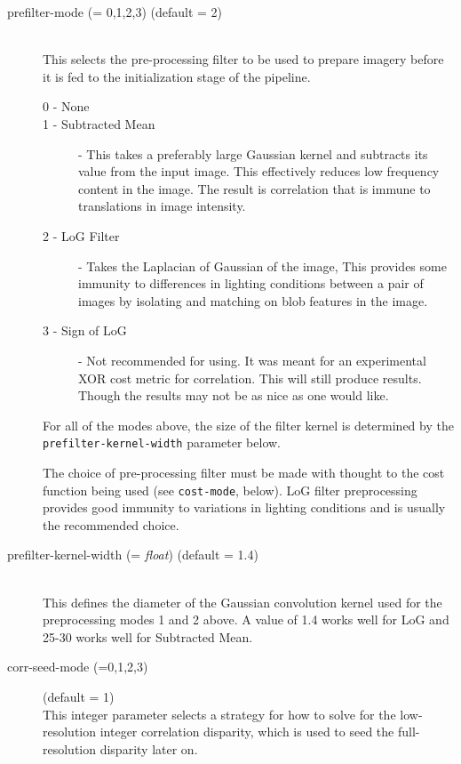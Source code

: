 \begin{description}

\item[prefilter-mode \textnormal{\small{(= 0,1,2,3)}} (default = 2)] \hfill \\
  This selects the pre-processing filter to be used to prepare imagery
  before it is fed to the initialization stage of the pipeline.

  \begin{description}
    \item[0 - None]
    \item[1 - Subtracted Mean] - This takes a preferably large
      Gaussian kernel and subtracts its value from the input
      image. This effectively reduces low frequency content in the
      image. The result is correlation that is immune to translations
      in image intensity.
    \item[2 - LoG Filter] - Takes the Laplacian of Gaussian of the
      image, This provides some immunity to differences in lighting
      conditions between a pair of images by isolating and matching on
      blob features in the image.
    \item[3 - Sign of LoG] - Not recommended for using. It was meant
      for an experimental XOR cost metric for correlation. This will
      still produce results. Though the results may not be as nice as
      one would like.
  \end{description}

  For all of the modes above, the size of the filter kernel is
  determined by the \texttt{prefilter-kernel-width} parameter below.

  The choice of pre-processing filter must be made with thought to the
  cost function being used (see \texttt{cost-mode}, below).  LoG filter
  preprocessing provides good immunity to variations in lighting
  conditions and is usually the recommended choice.

\item[prefilter-kernel-width \textnormal{\small{(= \emph{float})}} (default = 1.4)] \hfill \\
  This defines the diameter of the Gaussian convolution kernel used
  for the preprocessing modes 1 and 2 above. A value of 1.4 works
  well for LoG and 25-30 works well for Subtracted Mean.

\item[corr-seed-mode \textnormal{\small{(=0,1,2,3)}}] (default = 1) \hfill \\
  This integer parameter selects a strategy for how to solve for the
  low-resolution integer correlation disparity, which is used to seed
  the full-resolution disparity later on.


\end{description}
